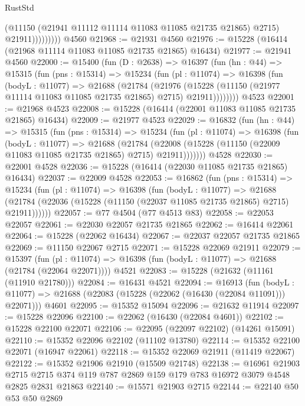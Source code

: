 \begin{lexlean}{RustStd}
\begin{coremodule}
                      (@11150 (@21941 @11112 @11114 @11083 @11085 @21735 @21865) @2715)
                      @21911)))))))))
    @4560
@21968 := @21931 @4560
@21976 := @15228 (@16414 (@21968 @11114 @11083 @11085 @21735 @21865) @16434)
@21977 := @21941 @4560
@22000 := @15400
    (fun (D : @2638) =>
    @16397
      (fun (hn : @44) =>
      @15315
        (fun (pns : @15314) =>
        @15234
          (fun (pl : @11074) =>
          @16398
            (fun (bodyL : @11077) =>
            @21688
              (@21784
                (@21976
                  (@15228 (@11150 (@21977 @11114 @11083 @11085 @21735 @21865) @2715) @21911))))))))
    @4523
@22001 := @21968 @4523
@22008 := @15228 (@16414 (@22001 @11083 @11085 @21735 @21865) @16434)
@22009 := @21977 @4523
@22029 := @16832
    (fun (hn : @44) =>
    @15315
      (fun (pns : @15314) =>
      @15234
        (fun (pl : @11074) =>
        @16398
          (fun (bodyL : @11077) =>
          @21688
            (@21784
              (@22008 (@15228 (@11150 (@22009 @11083 @11085 @21735 @21865) @2715) @21911)))))))
    @4528
@22030 := @22001 @4528
@22036 := @15228 (@16414 (@22030 @11085 @21735 @21865) @16434)
@22037 := @22009 @4528
@22053 := @16862
    (fun (pns : @15314) =>
    @15234
      (fun (pl : @11074) =>
      @16398
        (fun (bodyL : @11077) =>
        @21688 (@21784 (@22036 (@15228 (@11150 (@22037 @11085 @21735 @21865) @2715) @21911))))))
@22057 := @77 @4504 (@77 @4513 @83)
@22058 := @22053 @22057
@22061 := @22030 @22057 @21735 @21865
@22062 := @16414 @22061
@22064 := @15228 (@22062 @16434)
@22067 := @22037 @22057 @21735 @21865
@22069 := @11150 @22067 @2715
@22071 := @15228 @22069 @21911
@22079 := @15397
    (fun (pl : @11074) => @16398 (fun (bodyL : @11077) => @21688 (@21784 (@22064 @22071))))
    @4521
@22083 := @15228 (@21632 (@11161 (@11910 @21780)))
@22084 := @16431 @4521
@22094 := @16913
    (fun (bodyL : @11077) => @21688 (@22083 (@15228 (@22062 (@16430 (@22084 @11091))) @22071)))
    @4601
@22095 := @15352 @15094
@22096 := @21632 @11914
@22097 := @15228 @22096
@22100 := @22062 (@16430 (@22084 @4601))
@22102 := @15228 @22100 @22071
@22106 := @22095 (@22097 @22102) (@14261 @15091)
@22110 := @15352 @22096 @22102 (@11102 @13780)
@22114 := @15352 @22100 @22071 (@16947 @22061)
@22118 := @15352 @22069 @21911 (@11419 @22067)
@22122 := @15352 @21906 @21910 (@15509 @21748)
@22138 := @16961
    @21903
    @2715
    @2715
    @374
    @119
    @787
    @2869
    @159
    @179
    @783
    @16972
    @3079
    @4548
    @2825
    @2831
    @21863
@22140 := @15571 @21903 @2715
@22144 := @22140 @50 @53 @50 @2869

\end{coremodule}
\end{lexlean}
